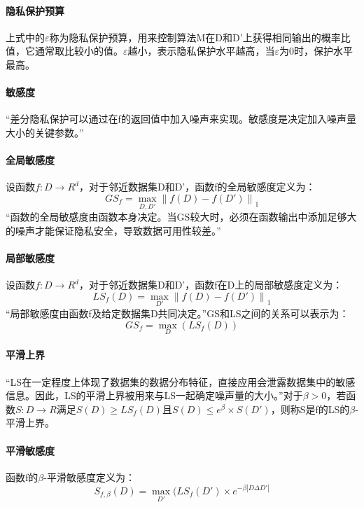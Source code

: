 \documentclass[12pt,a4paper]{article}
\begin{document}
\paragraph{隐私保护预算} 上式中的$\varepsilon$称为隐私保护预算，用来控制算法M在D和D'上获得相同输出的概率比值，它通常取比较小的值。$\varepsilon$越小，表示隐私保护水平越高，当$\varepsilon$为0时，保护水平最高。
\paragraph{敏感度} “差分隐私保护可以通过在f的返回值中加入噪声来实现。敏感度是决定加入噪声量大小的关键参数。”
\paragraph{全局敏感度} 设函数$f:D\rightarrow R^d$，对于邻近数据集D和D'，函数f的全局敏感度定义为：
\begin{equation}
	GS_f=\max_{D,D'} \left \| f(D)-f(D') \right \|_1
\end{equation}
“函数的全局敏感度由函数本身决定。当GS较大时，必须在函数输出中添加足够大的噪声才能保证隐私安全，导致数据可用性较差。”
\paragraph{局部敏感度} 设函数$f:D\rightarrow R^d$，对于邻近数据集D和D'，函数f在D上的局部敏感度定义为：
\begin{equation}
	LS_f(D) = \max_{D'} \left \| f(D)-f(D') \right \|_1
\end{equation}
“局部敏感度由函数f及给定数据集D共同决定。”GS和LS之间的关系可以表示为：
\begin{equation}
	GS_f=\max_D(LS_f(D))
\end{equation}
\paragraph{平滑上界} “LS在一定程度上体现了数据集的数据分布特征，直接应用会泄露数据集中的敏感信息。因此，LS的平滑上界被用来与LS一起确定噪声量的大小。”对于$\beta>0$，若函数$S:D\rightarrow R$满足$S(D) \geq LS_f(D)$且$S(D) \leq e^\beta \times S(D')$，则称S是f的LS的$\beta$-平滑上界。
\paragraph{平滑敏感度} 函数f的$\beta$-平滑敏感度定义为：
\begin{equation}
	S_{f,\beta}(D)=\max_{D'}(LS_f(D')\times e^{-\beta |D\Delta D'|}
\end{equation}
\end{document}

